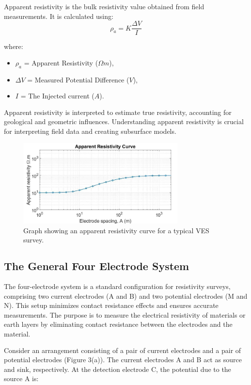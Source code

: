 \documentclass[12pt,a4paper]{report}
\begin{document}
Apparent resistivity is the bulk resistivity value obtained from field measurements. It is calculated using:
\begin{equation}
\rho_a = K \frac{\Delta V}{I}
\end{equation}

where:
\begin{itemize}
    \item $\rho_a$ = Apparent Resistivity ($\Omega m$),
    \item $\Delta V$ = Measured Potential Difference ($V$),
    \item $I$ = The Injected current ($A$).
\end{itemize}

Apparent resistivity is interpreted to estimate true resistivity, accounting for geological and geometric influences. Understanding apparent resistivity is crucial for interpreting field data and creating subsurface models.

\begin{figure}[h]
    \centering
    \includegraphics[width=0.75\textwidth]{Apparent-resistivity-curve-for-a-two-layer-model.png}
    \caption{Graph showing an apparent resistivity curve for a typical VES survey.}
\end{figure}

\subsection{The General Four Electrode System}

The four-electrode system is a standard configuration for resistivity surveys, comprising two current electrodes (A and B) and two potential electrodes (M and N). This setup minimizes contact resistance effects and ensures accurate measurements. The purpose is to measure the electrical resistivity of materials or earth layers by eliminating contact resistance between the electrodes and the material.

Consider an arrangement consisting of a pair of current electrodes and a pair of potential electrodes (Figure 3(a)). The current electrodes A and B act as source and sink, respectively. At the detection electrode C, the potential due to the source A is:
\end{document}
